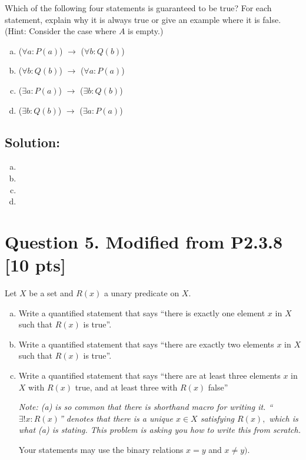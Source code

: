 \documentclass[12pt]{article}
\begin{document}
 Which of the following four statements is guaranteed to be true? For each statement, explain why it is always true or give an example where it is false. (Hint: Consider the case where $A$ is empty.)
\begin{enumerate}[(a)]
    \item  ($\forall a : P(a)$) $\rightarrow$ ($\forall b : Q(b)$)

    \item  ($\forall b : Q(b)$) $\rightarrow$ ($\forall a : P(a)$) 

    \item  ($\exists a : P(a)$) $\rightarrow$ ($\exists b : Q(b)$) 

    \item ($\exists b : Q(b)$) $\rightarrow$ ($\exists a : P(a)$)

\end{enumerate}



\subsection*{\textbf{Solution:}}
\begin{enumerate}[(a)]
    \item
    \item 
    \item 
    \item
\end{enumerate}




\newpage




\section*{\textbf{Question 5. Modified from P2.3.8} [10 pts]}
 Let $X$ be a set and $R(x)$ a unary predicate on $X$.

\begin{enumerate}[(a)]

    \item  Write a quantified statement that says “there is  exactly one
    element $x$ in $X$ such that $R(x)$ is true”.
    \item  Write a quantified statement that says “there are exactly two elements $x$ in $X$ such that $R(x)$ is true”.
    
    \item  Write a quantified statement that says “there are at least three elements $x$ in $X$ with $R(x)$ true, and at least three with $R(x)$ false”

{\em \small Note:  (a) is so common that there is shorthand  macro for writing it.  ``\, $\exists! x: R(x)$'' denotes that there is a unique $x \in X$ satisfying $R(x),$ which is what (a) is stating. This problem is asking you how to write this from scratch. 

Your statements may use  the binary relations $x = y$ and $x \neq y).$}
\end{enumerate}
\end{document}
